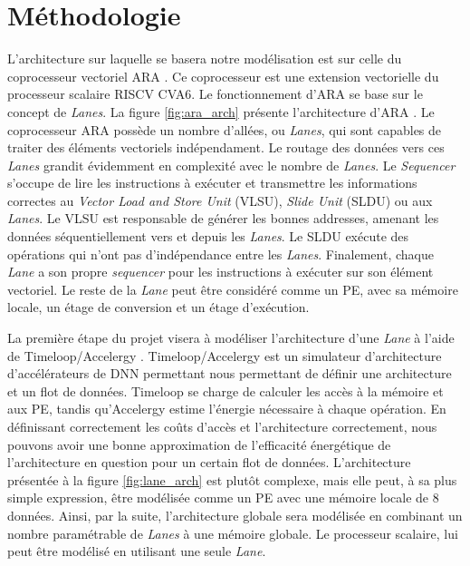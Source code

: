 \documentclass[11pt,letterpaper]{article}
\begin{document}
\section*{Méthodologie}
    L'architecture sur laquelle se basera notre modélisation est sur celle du coprocesseur 
    vectoriel ARA \cite{ara_paper}. Ce coprocesseur est une extension vectorielle du processeur scalaire
    RISCV CVA6. Le fonctionnement d’ARA se base sur le concept de \textit{Lanes}. 
    La figure \ref{fig:ara_arch} présente l'architecture d’ARA \cite{bougenot_2020}.
    Le coprocesseur ARA possède un nombre d'allées, ou \textit{Lanes}, qui sont capables de traiter des
    éléments vectoriels indépendament. Le routage des données vers ces \textit{Lanes} grandit évidemment en complexité
    avec le nombre de \textit{Lanes}. Le \textit{Sequencer} s'occupe de lire les instructions à exécuter 
    et transmettre les informations correctes au \textit{Vector Load and Store Unit} (VLSU), 
    \textit{Slide Unit} (SLDU) ou aux \textit{Lanes}. Le VLSU est responsable de générer les bonnes
    addresses, amenant les données séquentiellement vers et depuis les \textit{Lanes}. 
    Le SLDU exécute des opérations qui n'ont pas d'indépendance entre les \textit{Lanes}.
    Finalement, chaque \textit{Lane} a son propre \textit{sequencer} pour les instructions à exécuter
    sur son élément vectoriel. Le reste de la \textit{Lane} peut être considéré comme un PE, avec sa mémoire locale,
    un étage de conversion et un étage d'exécution.

    La première étape du projet visera à modéliser l'architecture d'une \textit{Lane} à
    l'aide de Timeloop/Accelergy \cite{timeloop}.
    Timeloop/Accelergy est un simulateur d'architecture d'accélérateurs de DNN permettant nous permettant de 
    définir une architecture et un flot de données. Timeloop se charge de calculer les accès à la mémoire et 
    aux PE, tandis qu'Accelergy estime l'énergie nécessaire à chaque opération. En définissant correctement
    les coûts d'accès et l'architecture correctement, nous pouvons avoir une bonne approximation de l'efficacité 
    énergétique de l'architecture en question pour un certain flot de données.
    L'architecture présentée à la figure \ref{fig:lane_arch}
    est plutôt complexe, mais elle peut, à sa plus simple expression, être modélisée comme
    un PE avec une mémoire locale de 8 données. Ainsi, par la suite, l'architecture globale
    sera modélisée en combinant un nombre paramétrable de \textit{Lanes} à une mémoire globale.
    Le processeur scalaire, lui peut être modélisé en utilisant une seule \textit{Lane}.
\end{document}
